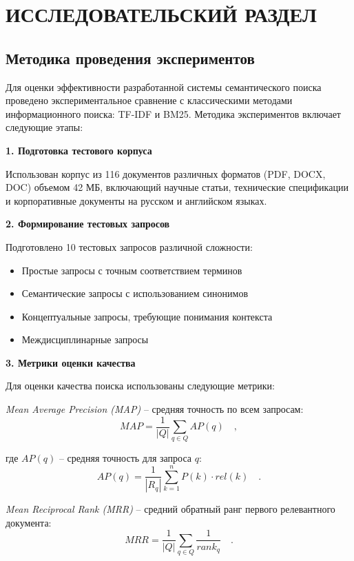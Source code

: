 \chapter{ИССЛЕДОВАТЕЛЬСКИЙ РАЗДЕЛ}

\section{Методика проведения экспериментов}

\justifying

Для оценки эффективности разработанной системы семантического поиска проведено экспериментальное сравнение с классическими методами информационного поиска: TF-IDF и BM25. Методика экспериментов включает следующие этапы:

\textbf{1. Подготовка тестового корпуса}

Использован корпус из 116 документов различных форматов (PDF, DOCX, DOC) объемом 42 МБ, включающий научные статьи, технические спецификации и корпоративные документы на русском и английском языках.

\textbf{2. Формирование тестовых запросов}

Подготовлено 10 тестовых запросов различной сложности:
\begin{itemize}
	\item Простые запросы с точным соответствием терминов
	\item Семантические запросы с использованием синонимов
	\item Концептуальные запросы, требующие понимания контекста
	\item Междисциплинарные запросы
\end{itemize}

\textbf{3. Метрики оценки качества}

Для оценки качества поиска использованы следующие метрики:

\textit{Mean Average Precision (MAP)} – средняя точность по всем запросам:
\begin{equation}
	MAP = \frac{1}{|Q|} \sum_{q \in Q} AP(q) \quad,
\end{equation}

\noindent где $AP(q)$ – средняя точность для запроса $q$:
\begin{equation}
	AP(q) = \frac{1}{|R_q|} \sum_{k=1}^{n} P(k) \cdot rel(k) \quad.
\end{equation}

\textit{Mean Reciprocal Rank (MRR)} – средний обратный ранг первого релевантного документа:
\begin{equation}
	MRR = \frac{1}{|Q|} \sum_{q \in Q} \frac{1}{rank_q} \quad.
\end{equation}

